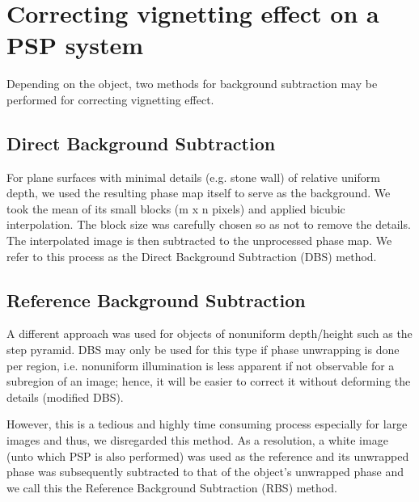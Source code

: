 \section{Correcting vignetting effect on a PSP system}

Depending on the object, two methods for background subtraction may be performed for correcting vignetting effect.


\subsection{Direct Background Subtraction}

For plane surfaces with minimal details (e.g. stone wall) of relative uniform depth, we used the resulting phase map itself to serve as the background. 
We took the mean of its small blocks (m x n pixels) and applied bicubic interpolation. The block size was carefully chosen so as not to remove the details.
The interpolated image is then subtracted to the unprocessed phase map. We refer to this process as the Direct Background Subtraction (DBS) method.


\subsection{Reference Background Subtraction}

A different approach was used for objects of nonuniform depth/height such as the step pyramid. 
DBS may only be used for this type if phase unwrapping is done per region, i.e. nonuniform illumination is less apparent if not observable for a subregion of an image; hence, it will be easier to correct it without deforming the details (modified DBS).


However, this is a tedious and highly time consuming process especially for large images and thus, we disregarded this method. As a resolution, a white image (unto which PSP is also performed) was used as the reference and its unwrapped phase was subsequently subtracted to that of the object's unwrapped phase and we call this the Reference Background Subtraction (RBS) method.